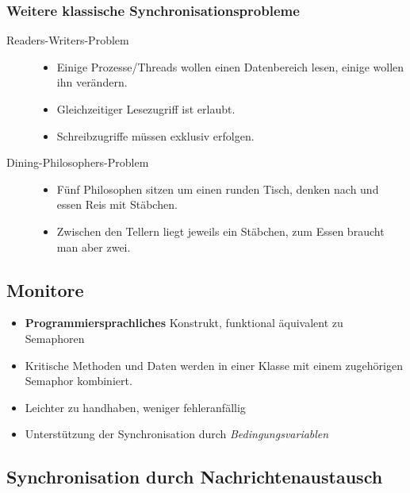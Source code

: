 \documentclass[11pt]{article}
\begin{document}
\subsubsection*{Weitere klassische Synchronisationsprobleme}
\label{sec:orgcc9fc33}
\begin{description}
\item[{Readers-Writers-Problem}] \begin{itemize}
\item Einige Prozesse/Threads wollen einen Datenbereich lesen, einige
wollen ihn verändern.
\item Gleichzeitiger Lesezugriff ist erlaubt.
\item Schreibzugriffe müssen exklusiv erfolgen.
\end{itemize}
\item[{Dining-Philosophers-Problem}] \begin{itemize}
\item Fünf Philosophen sitzen um einen runden Tisch, denken nach und
essen Reis mit Stäbchen.
\item Zwischen den Tellern liegt jeweils ein Stäbchen, zum Essen braucht man aber zwei.
\end{itemize}
\end{description}

\subsection*{Monitore}
\label{sec:org2fe89c8}
\begin{itemize}
\item \textbf{Programmiersprachliches} Konstrukt, funktional äquivalent zu Semaphoren
\item Kritische Methoden und Daten werden in einer Klasse mit einem
zugehörigen Semaphor kombiniert.
\item Leichter zu handhaben, weniger fehleranfällig
\item Unterstützung der Synchronisation durch \emph{Bedingungsvariablen}
\end{itemize}

\subsection*{Synchronisation durch Nachrichtenaustausch}
\label{sec:orgd66a7bd}
\end{document}
